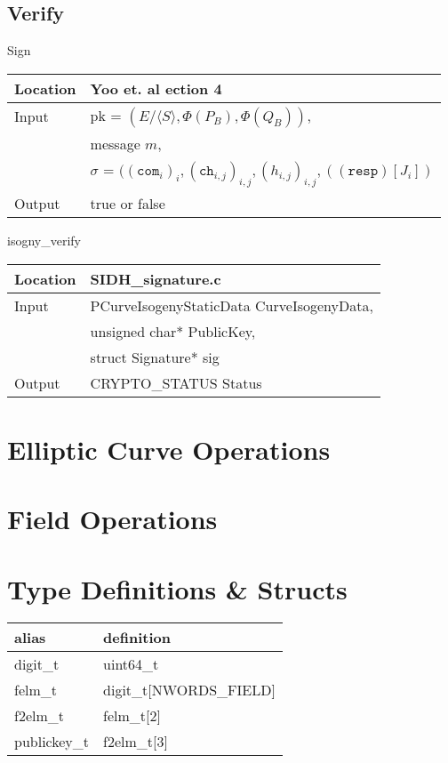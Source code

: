 \documentclass[10pt]{article}
\begin{document}
\subsection{Verify}

\parbox[t]{.40\linewidth}{
\centering
Sign
\begin{tabular}{@{}ll@{}}
	\toprule
	Location & Yoo et. al ection 4 \\
	\midrule
	Input & pk = $(E/\langle S \rangle, \Phi(P_B), \Phi(Q_B))$, \\
	& message $m$,\\
	& $\sigma$ = $((\texttt{com}_{i})_{i}, (\texttt{ch}_{i,j})_{i,j}, (h_{i,j})_{i,j}, ((\texttt{resp})[J_{i}])$\\
	\midrule
	Output & true or false\\
	\bottomrule
\end{tabular}}
\hfill
\parbox[t]{.40\linewidth}{
\centering
isogny\_verify
\begin{tabular}{@{}ll@{}}
	\toprule
	Location & SIDH\_signature.c \\
	\midrule
	Input & PCurveIsogenyStaticData CurveIsogenyData,\\
	& unsigned char* PublicKey,\\
	& struct Signature* sig\\
	\midrule
	Output & CRYPTO\_STATUS Status\\
	\bottomrule
\end{tabular}}

\section{Elliptic Curve Operations}

\section{Field Operations}

\section{Type Definitions \& Structs}

\begin{center}
\begin{tabular}{@{}ll@{}}
	\toprule
	alias & definition \\
	\midrule
	digit\_t & uint64\_t\\
	felm\_t & digit\_t[NWORDS\_FIELD]\\
	f2elm\_t & felm\_t[2]\\
	publickey\_t & f2elm\_t[3]\\
	\bottomrule
\end{tabular}
\end{center}
\end{document}
